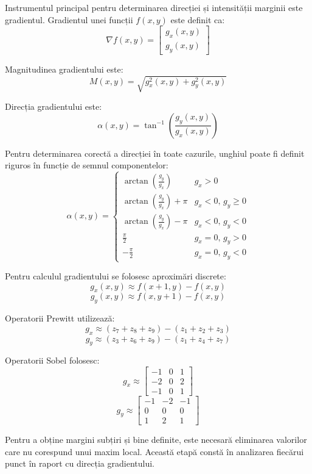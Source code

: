Instrumentul principal pentru determinarea direcției și intensității marginii este gradientul. Gradientul unei funcții \( f(x, y) \) este definit ca:
\[
    \nabla f(x, y) =
    \begin{bmatrix}
        g_x(x, y) \\
        g_y(x, y)
    \end{bmatrix}
\]

Magnitudinea gradientului este:
\[
    M(x, y) = \sqrt{g_x^2(x, y) + g_y^2(x, y)}
\]

Direcția gradientului este:
\[
    \alpha(x, y) = \tan^{-1}\left(\frac{g_y(x, y)}{g_x(x, y)}\right)
\]

Pentru determinarea corectă a direcției în toate cazurile, unghiul poate fi definit riguros în funcție de semnul componentelor:
\[
\alpha(x,y) =
\begin{cases}
\arctan\left(\frac{g_y}{g_x}\right) & g_x > 0 \\
\arctan\left(\frac{g_y}{g_x}\right) + \pi & g_x < 0,\, g_y \geq 0 \\
\arctan\left(\frac{g_y}{g_x}\right) - \pi & g_x < 0,\, g_y < 0 \\
\frac{\pi}{2} & g_x = 0,\, g_y > 0 \\
-\frac{\pi}{2} & g_x = 0,\, g_y < 0
\end{cases}
\]

Pentru calculul gradientului se folosesc aproximări discrete:
\[
    g_x(x, y) \approx f(x+1, y) - f(x, y)
\]
\[
    g_y(x, y) \approx f(x, y+1) - f(x, y)
\]

Operatorii Prewitt utilizează:
\[
    g_x \approx (z_7 + z_8 + z_9) - (z_1 + z_2 + z_3)
\]
\[
    g_y \approx (z_3 + z_6 + z_9) - (z_1 + z_4 + z_7)
\]

Operatorii Sobel folosesc:
\[
    g_x \approx
    \begin{bmatrix}
        -1 & 0 & 1 \\
        -2 & 0 & 2 \\
        -1 & 0 & 1
    \end{bmatrix}
\]
\[
    g_y \approx
    \begin{bmatrix}
        -1 & -2 & -1 \\
        0  & 0  & 0  \\
        1  & 2  & 1
    \end{bmatrix}
\]

Pentru a obține margini subțiri și bine definite, este necesară eliminarea valorilor care nu corespund unui maxim local. Această etapă constă în analizarea fiecărui punct în raport cu direcția gradientului.

